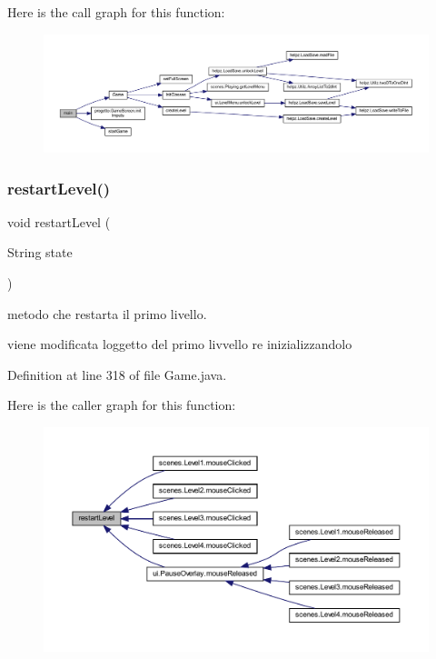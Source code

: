 Here is the call graph for this function\+:
\nopagebreak
\begin{figure}[H]
\begin{center}
\leavevmode
\includegraphics[width=350pt]{classprogetto_1_1_game_a8b260eecbaabcef8473fd87ada040682_cgraph}
\end{center}
\end{figure}
\mbox{\label{classprogetto_1_1_game_a822df2119249080840a3149d454807d5}} 
\subsubsection{\texorpdfstring{restart\+Level()}{restartLevel()}}
{\footnotesize\ttfamily void restart\+Level (\begin{DoxyParamCaption}\item[{String}]{state }\end{DoxyParamCaption})}



metodo che restarta il primo livello. 

viene modificata l\textquotesingle{}oggetto del primo livvello re inizializzandolo 

Definition at line 318 of file Game.\+java.

Here is the caller graph for this function\+:\nopagebreak
\begin{figure}[H]
\begin{center}
\leavevmode
\includegraphics[width=350pt]{classprogetto_1_1_game_a822df2119249080840a3149d454807d5_icgraph}
\end{center}
\end{figure}
\mbox{\label{classprogetto_1_1_game_a13a43e6d814de94978c515cb084873b1}} 
